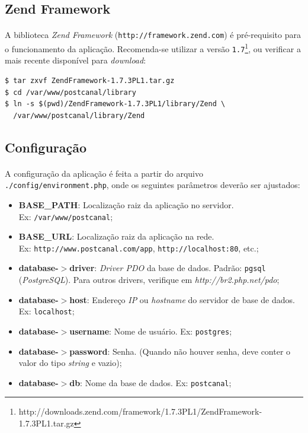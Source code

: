 \documentclass[a4paper,12pt]{article}
\begin{document}
\subsection{Zend Framework}

\paragraph{}
A biblioteca \emph{Zend Framework} (\texttt{http://framework.zend.com}) é
pré-requisito para o funcionamento da aplicação. Recomenda-se utilizar a versão
\texttt{1.7}\footnote{http://downloads.zend.com/framework/1.7.3PL1/ZendFramework-1.7.3PL1.tar.gz},
ou verificar a mais recente disponível para \emph{download}:

\begin{verbatim}
$ tar zxvf ZendFramework-1.7.3PL1.tar.gz
$ cd /var/www/postcanal/library
$ ln -s $(pwd)/ZendFramework-1.7.3PL1/library/Zend \
  /var/www/postcanal/library/Zend
\end{verbatim}

\subsection{Configuração}

\paragraph{}
A configuração da aplicação é feita a partir do arquivo
\texttt{./config/environment.php}, onde os seguintes parâmetros deverão ser
ajustados:

\begin{itemize}
\item \textbf{BASE\_PATH}: Localização raiz da aplicação no servidor. \\
Ex: \texttt{/var/www/postcanal};
\item \textbf{BASE\_URL}: Localização raiz da aplicação na rede. \\ 
Ex: \texttt{http://www.postcanal.com/app}, \texttt{http://localhost:80}, etc.;
\item \textbf{database-$>$driver}: \emph{Driver PDO} da base de dados. Padrão:
\texttt{pgsql} (\emph{PostgreSQL}). Para outros drivers, verifique em
\emph{http://br2.php.net/pdo};
\item \textbf{database-$>$host}: Endereço \emph{IP} ou \emph{hostname} do
servidor de base de dados. Ex: \texttt{localhost};
\item \textbf{database-$>$username}: Nome de usuário. Ex: \texttt{postgres};
\item \textbf{database-$>$password}: Senha. (Quando não houver senha, deve
conter o valor do tipo \emph{string} e vazio);
\item \textbf{database-$>$db}: Nome da base de dados. Ex: \texttt{postcanal};
\end{itemize}
\end{document}
